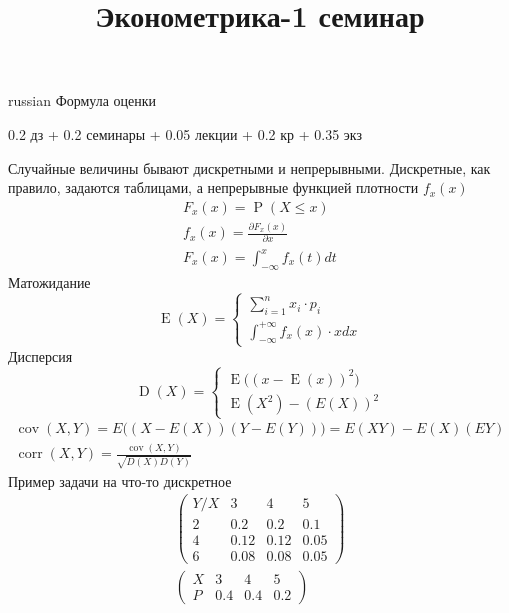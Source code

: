\documentclass{article}
\begin{document}
\title{\foreignlanguage{russian}{Эконометрика-1 семинар}}
\maketitle

\begin{otherlanguage*}{russian}
Формула оценки 

0.2 дз + 0.2 семинары + 0.05 лекции + 0.2 кр + 0.35 экз


Случайные величины бывают дискретными и непрерывными. Дискретные, как правило, задаются таблицами, а непрерывные функцией плотности $f_x(x)$
\begin{align}
F_x(x) = \operatorname{P}(X \le x) \\
f_x(x) = \frac{\partial F_x(x)}{\partial x} \\
F_x(x) = \int_{-\infty}^x f_x(t) dt
\end{align}
Матожидание
\begin{equation}
\operatorname{E} (X) = \begin{cases} 
\sum_{i=1}^n x_i \cdot p_i \\
\int_{-\infty}^{+\infty} f_x(x) \cdot x dx 
\end{cases}
\end{equation}
Дисперсия
\begin{equation}
\operatorname{D} (X) = \begin{cases} 
\operatorname{E} \big( (x - \operatorname{E}(x))^2\big) \\
\operatorname{E}(X^2) - (E(X))^2
\end{cases}
\end{equation}
\begin{align}
\operatorname{cov}(X, Y) = E \big( (X - E(X)) (Y - E(Y)) \big) = E(XY) - E(X)(EY) \\
\operatorname{corr}(X, Y) = \frac{\operatorname{cov}(X,Y)}{\sqrt{D(X)D(Y)}}
\end{align}
Пример задачи на что-то дискретное
\begin{align}
\begin{pmatrix}
Y / X & 3 & 4 & 5 \\
2 & 0.2 & 0.2 & 0.1 \\
4 & 0.12 & 0.12 & 0.05 \\
6 & 0.08 & 0.08 & 0.05
\end{pmatrix} \\
\begin{pmatrix}
X & 3 & 4 & 5 \\
P & 0.4 & 0.4 & 0.2
\end{pmatrix} \\

\end{align}
\end{otherlanguage*}
\end{document}
